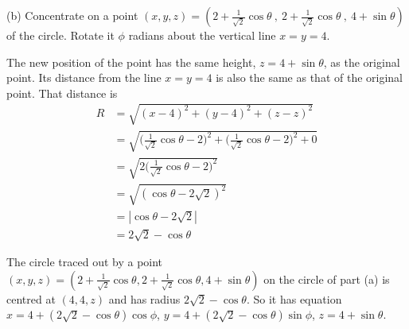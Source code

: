 \begin{solution}
(b) Concentrate on a point $(x,y,z)=(2+\frac1{\sqrt 2}\cos\theta~,~2+\frac1{\sqrt 2}\cos\theta~,~4+\sin\theta)$ of the circle. Rotate it $\phi$ radians about the vertical line $x=y=4$.
\begin{center}
\end{center}
The new position of the point has the same height, $z=4+\sin\theta$, as the original point. Its distance from the line $x=y=4$ is also the same as that of the original point. That distance is 
\begin{align*}
 R&=\sqrt{(x-4)^2+(y-4)^2+(z-z)^2} \\
  &=\sqrt{\Big(\frac1{\sqrt 2}\cos\theta-2\Big)^2+\Big(\frac1{\sqrt 2}\cos\theta-2\Big)^2+0} \\
  &= \sqrt{2\Big(\frac1{\sqrt 2}\cos\theta-2\Big)^2} \\
  &= \sqrt{(\cos\theta-2\sqrt{2})^2} \\
   &=|\cos\theta-2\sqrt2| \\
   &=2\sqrt2 - \cos\theta
 \end{align*}

The circle traced out by a point $(x,y,z)=(2+\frac1{\sqrt2}\cos\theta,2+\frac{1}{\sqrt 2} \cos \theta,4+\sin\theta)$ on the circle of part (a) is centred at $(4,4,z)$ and has radius $2\sqrt2 - \cos\theta$. So it has equation 
 $x=4+(2\sqrt2-\cos\theta)\cos\phi$, $y=4+(2\sqrt2-\cos\theta)\sin\phi$, $z=4+\sin\theta$.
\end{solution}



